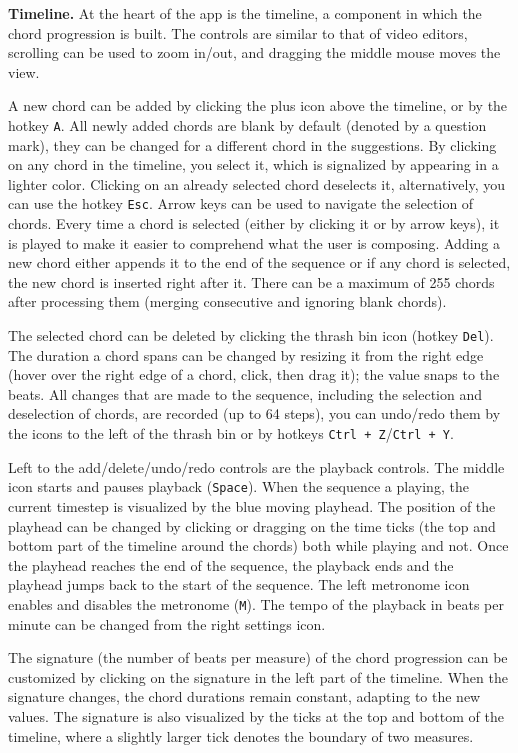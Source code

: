 \documentclass{article}
\begin{document}
\textbf{Timeline.} At the heart of the app is the timeline, a component in which the chord progression is built. The controls are similar to that of video editors, scrolling can be used to zoom in/out, and dragging the middle mouse moves the view.

A new chord can be added by clicking the plus icon above the timeline, or by the hotkey \texttt{A}. All newly added chords are blank by default (denoted by a question mark), they can be changed for a different chord in the suggestions. By clicking on any chord in the timeline, you select it, which is signalized by appearing in a lighter color. Clicking on an already selected chord deselects it, alternatively, you can use the hotkey \texttt{Esc}. Arrow keys can be used to navigate the selection of chords. Every time a chord is selected (either by clicking it or by arrow keys), it is played to make it easier to comprehend what the user is composing. Adding a new chord either appends it to the end of the sequence or if any chord is selected, the new chord is inserted right after it. There can be a maximum of 255 chords after processing them (merging consecutive and ignoring blank chords).

The selected chord can be deleted by clicking the thrash bin icon (hotkey \texttt{Del}). The duration a chord spans can be changed by resizing it from the right edge (hover over the right edge of a chord, click, then drag it); the value snaps to the beats. All changes that are made to the sequence, including the selection and deselection of chords, are recorded (up to 64 steps), you can undo/redo them by the icons to the left of the thrash bin or by hotkeys \texttt{Ctrl + Z}/\texttt{Ctrl + Y}.

Left to the add/delete/undo/redo controls are the playback controls. The middle icon starts and pauses playback (\texttt{Space}). When the sequence a playing, the current timestep is visualized by the blue moving playhead. The position of the playhead can be changed by clicking or dragging on the time ticks (the top and bottom part of the timeline around the chords) both while playing and not. Once the playhead reaches the end of the sequence, the playback ends and the playhead jumps back to the start of the sequence. The left metronome icon enables and disables the metronome (\texttt{M}). The tempo of the playback in beats per minute can be changed from the right settings icon.

The signature (the number of beats per measure) of the chord progression can be customized by clicking on the signature in the left part of the timeline. When the signature changes, the chord durations remain constant, adapting to the new values. The signature is also visualized by the ticks at the top and bottom of the timeline, where a slightly larger tick denotes the boundary of two measures.
\end{document}
